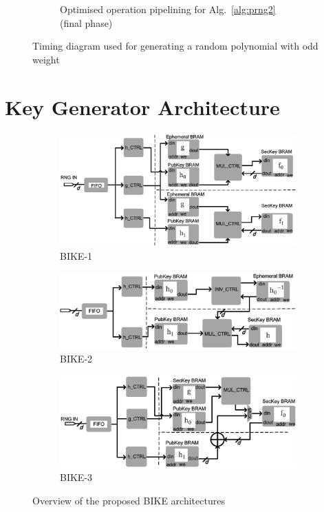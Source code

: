 \documentclass[runningheads]{llncs}
\begin{document}
\begin{figure}[!tb]
\begin{subfigure}[t]{0.45\textwidth}
\caption{Optimised operation pipelining for Alg.~\ref{alg:prng2} (final phase) }
\label{fig:pipeline_rng3}
\end{subfigure}
\caption{Timing diagram used for generating a random polynomial with odd weight}
\end{figure}

\section{Key Generator Architecture}
\begin{figure}[!tb]
\centering
\begin{subfigure}[t]{0.45\textwidth}\centering
\includegraphics[width=\textwidth]{./fig/BIKE-1.eps}
\caption{BIKE-1}
\label{fig:bike1}
\end{subfigure}
\hspace{1em}
\begin{subfigure}[t]{0.45\textwidth}\centering
\includegraphics[width=\textwidth]{./fig/BIKE-2.eps}
\caption{BIKE-2 }
\label{fig:bike2}
\end{subfigure}
\begin{subfigure}[t]{0.45\textwidth}\centering
\includegraphics[width=\textwidth]{./fig/BIKE-3.eps}
\caption{BIKE-3 }
\label{fig:bike3}
\end{subfigure}
\caption{Overview of the proposed BIKE architectures}
\end{figure}
\end{document}
